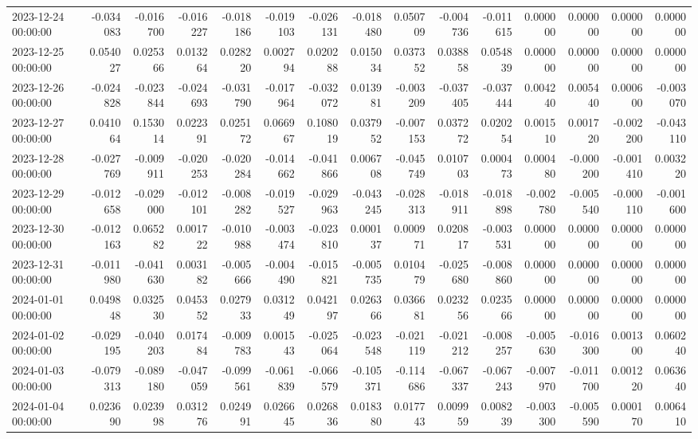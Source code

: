 \begin{tabular}{lrrrrrrrrrrrrrr}
2023-12-24 00:00:00 & -0.034083 & -0.016700 & -0.016227 & -0.018186 & -0.019103 & -0.026131 & -0.018480 & 0.050709 & -0.004736 & -0.011615 & 0.000000 & 0.000000 & 0.000000 & 0.000000 \\
2023-12-25 00:00:00 & 0.054027 & 0.025366 & 0.013264 & 0.028220 & 0.002794 & 0.020288 & 0.015034 & 0.037352 & 0.038858 & 0.054839 & 0.000000 & 0.000000 & 0.000000 & 0.000000 \\
2023-12-26 00:00:00 & -0.024828 & -0.023844 & -0.024693 & -0.031790 & -0.017964 & -0.032072 & 0.013981 & -0.003209 & -0.037405 & -0.037444 & 0.004240 & 0.005440 & 0.000600 & -0.003070 \\
2023-12-27 00:00:00 & 0.041064 & 0.153014 & 0.022391 & 0.025172 & 0.066967 & 0.108019 & 0.037952 & -0.007153 & 0.037272 & 0.020254 & 0.001510 & 0.001720 & -0.002200 & -0.043110 \\
2023-12-28 00:00:00 & -0.027769 & -0.009911 & -0.020253 & -0.020284 & -0.014662 & -0.041866 & 0.006708 & -0.045749 & 0.010703 & 0.000473 & 0.000480 & -0.000200 & -0.001410 & 0.003220 \\
2023-12-29 00:00:00 & -0.012658 & -0.029000 & -0.012101 & -0.008282 & -0.019527 & -0.029963 & -0.043245 & -0.028313 & -0.018911 & -0.018898 & -0.002780 & -0.005540 & -0.000110 & -0.001600 \\
2023-12-30 00:00:00 & -0.012163 & 0.065282 & 0.001722 & -0.010988 & -0.003474 & -0.023810 & 0.000137 & 0.000971 & 0.020817 & -0.003531 & 0.000000 & 0.000000 & 0.000000 & 0.000000 \\
2023-12-31 00:00:00 & -0.011980 & -0.041630 & 0.003182 & -0.005666 & -0.004490 & -0.015821 & -0.005735 & 0.010479 & -0.025680 & -0.008860 & 0.000000 & 0.000000 & 0.000000 & 0.000000 \\
2024-01-01 00:00:00 & 0.049848 & 0.032530 & 0.045352 & 0.027933 & 0.031249 & 0.042197 & 0.026366 & 0.036681 & 0.023256 & 0.023566 & 0.000000 & 0.000000 & 0.000000 & 0.000000 \\
2024-01-02 00:00:00 & -0.029195 & -0.040203 & 0.017484 & -0.009783 & 0.001543 & -0.025064 & -0.023548 & -0.021119 & -0.021212 & -0.008257 & -0.005630 & -0.016300 & 0.001300 & 0.060240 \\
2024-01-03 00:00:00 & -0.079313 & -0.089180 & -0.047059 & -0.099561 & -0.061839 & -0.066579 & -0.105371 & -0.114686 & -0.067337 & -0.067243 & -0.007970 & -0.011700 & 0.001220 & 0.063640 \\
2024-01-04 00:00:00 & 0.023690 & 0.023998 & 0.031276 & 0.024991 & 0.026645 & 0.026836 & 0.018380 & 0.017743 & 0.009959 & 0.008239 & -0.003300 & -0.005590 & 0.000170 & 0.006410 \\

\end{tabular}
